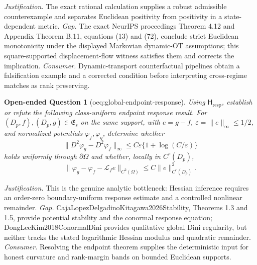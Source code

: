 \documentclass{article}
\newtheorem{openendedquestion}{Open-ended Question}
\begin{document}
\par\smallskip\noindent \textit{Justification.} The exact rational calculation supplies a robust admissible counterexample and separates Euclidean positivity from positivity in a state-dependent metric. \textit{Gap.} The exact NeurIPS proceedings Theorem 4.12 and Appendix Theorem B.11, equations (13) and (72), conclude strict Euclidean monotonicity under the displayed Markovian dynamic-OT assumptions; this square-supported displacement-flow witness satisfies them and corrects the implication. \textit{Consumer.} Dynamic-transport counterfactual pipelines obtain a falsification example and a corrected condition before interpreting cross-regime matches as rank preserving.

\begin{openendedquestion}[oeq:global-endpoint-response]\label{oeq:global-endpoint-response}
Using \(\mathsf H_{\mathrm{resp}}\), establish or refute the following class-uniform endpoint response result. For \((D_p,f),(D_p,g)\in\mathfrak E_s\) on the same support, with \(e=g-f\), \(\varepsilon=\lVert e\rVert_\infty\le1/2\), and normalized potentials \(\varphi_f,\varphi_g\), determine whether \[\lVert D^2\varphi_g-D^2\varphi_f\rVert_\infty\le C\varepsilon\{1+\log(C/\varepsilon)\}\] holds uniformly through \(\partial\Omega\) and whether, locally in \(C^r(D_p)\), \[\lVert\varphi_g-\varphi_f-\mathscr L_f e\rVert_{C^2(\Omega)}\le C\lVert e\rVert_{C^r(D_p)}^2.\]
\end{openendedquestion}
\par\smallskip\noindent \textit{Justification.} This is the genuine analytic bottleneck: Hessian inference requires an order-zero boundary-uniform response estimate and a controlled nonlinear remainder. \textit{Gap.} CajaLopezDelgadinoKitagawa2026Stability, Theorems 1.3 and 1.5, provide potential stability and the conormal response equation; DongLeeKim2018ConormalDini provides qualitative global Dini regularity, but neither tracks the stated logarithmic Hessian modulus and quadratic remainder. \textit{Consumer.} Resolving the endpoint theorem supplies the deterministic input for honest curvature and rank-margin bands on bounded Euclidean supports.
\end{document}
